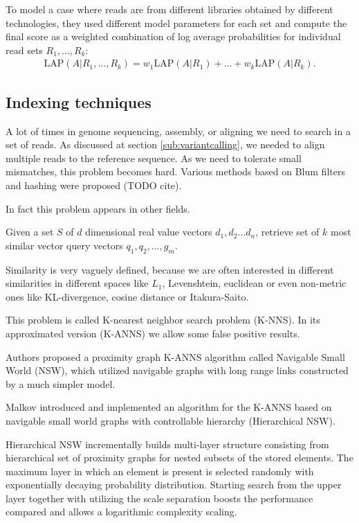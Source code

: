 To model a case where reads are from different libraries obtained by different technologies,
they used different model parameters for each set and compute the final score as a weighted combination of log average probabilities for individual read sets $R_1,\dots, R_k$:
$$\begin{aligned} \text {LAP}(A|R_1, \dots , R_k) = w_1 \text {LAP}(A|R_1) + \dots + w_k \text {LAP}(A|R_k). \end{aligned}$$

\subsection{Indexing techniques}
A lot of times in genome sequencing, assembly, or aligning we need to search in a set of reads.
As discussed at section \ref{sub:variantcalling}, we needed to align multiple reads to the reference sequence. 
As we need to tolerate small mismatches, this problem becomes hard.
Various methods based on Blum filters and hashing were proposed (TODO cite).

In fact this problem appears in other fields. 
\begin{definicia}
Given a set $S$ of $d$ dimensional real value vectors $d_1,d_2 \ldots d_n$, 
retrieve set of $k$ most similar vector query vectors $q_1,q_2,\ldots,g_m$.  
\end{definicia}

Similarity is very vaguely defined, because we are often interested in different similarities in different spaces like $L_1$, Levenshtein, euclidean 
or even non-metric ones like KL-divergence, cosine distance or Itakura-Saito.

This problem is called K-nearest neighbor search problem (K-NNS). 
In its approximated version (K-ANNS) we allow some false positive results.

Authors \cite{malkov2012scalable,malkov2014approximate} proposed a proximity graph K-ANNS algorithm called Navigable Small World (NSW), 
which utilized navigable graphs with long range links constructed by a much simpler model. 

Malkov\cite{malkov2016efficient} introduced and implemented\cite{nmslib2016} an algorithm for the K-ANNS based on navigable small world graphs with controllable hierarchy (Hierarchical NSW).

Hierarchical NSW incrementally builds multi-layer structure consisting from hierarchical set of  proximity graphs for nested subsets of the stored elements.
The maximum layer in which an element is present is selected randomly with exponentially decaying  probability distribution.
Starting search from the upper layer together with utilizing the scale separation boosts the performance compared and allows a logarithmic complexity scaling. 


